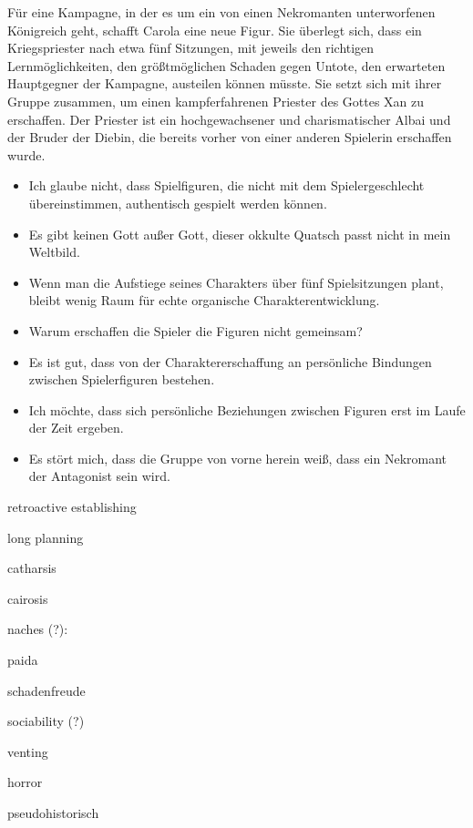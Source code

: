 \documentclass{article}
\begin{document}
Für eine Kampagne, in der es um ein von einen Nekromanten
unterworfenen Königreich geht, schafft Carola eine neue Figur.  Sie
überlegt sich, dass ein Kriegspriester nach etwa fünf Sitzungen, mit
jeweils den richtigen Lernmöglichkeiten, den größtmöglichen Schaden
gegen Untote, den erwarteten Hauptgegner der Kampagne, austeilen
können müsste. Sie setzt sich mit ihrer Gruppe zusammen, um einen
kampferfahrenen Priester des Gottes Xan zu erschaffen. Der Priester
ist ein hochgewachsener und charismatischer Albai und der Bruder der
Diebin, die bereits vorher von einer anderen Spielerin erschaffen wurde.
\begin{itemize}
\item Ich glaube nicht, dass Spielfiguren, die nicht mit dem Spielergeschlecht übereinstimmen, authentisch gespielt werden können.
\item Es gibt keinen Gott außer Gott, dieser okkulte Quatsch passt nicht in mein Weltbild.
\item Wenn man die Aufstiege seines Charakters über fünf Spielsitzungen plant, bleibt wenig Raum für echte organische Charakterentwicklung.
\item Warum erschaffen die Spieler die Figuren nicht gemeinsam?
\item Es ist gut, dass von der Charaktererschaffung an persönliche Bindungen zwischen Spielerfiguren bestehen.
\item Ich möchte, dass sich persönliche Beziehungen zwischen Figuren erst im Laufe der Zeit ergeben.
\item Es stört mich, dass die Gruppe von vorne herein weiß, dass ein Nekromant der Antagonist sein wird.
\end{itemize}


retroactive establishing

long planning

catharsis

cairosis

naches (?):

paida

schadenfreude

sociability (?)

venting

horror

pseudohistorisch 
\end{document}
